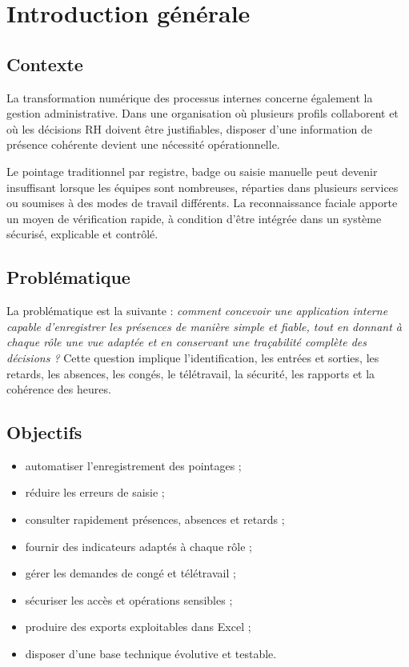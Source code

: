 \documentclass[11pt,a4paper,oneside]{report}
\begin{document}
\chapter{Introduction générale}
\section{Contexte}
La transformation numérique des processus internes concerne également la gestion administrative. Dans une organisation où plusieurs profils collaborent et où les décisions RH doivent être justifiables, disposer d'une information de présence cohérente devient une nécessité opérationnelle.

Le pointage traditionnel par registre, badge ou saisie manuelle peut devenir insuffisant lorsque les équipes sont nombreuses, réparties dans plusieurs services ou soumises à des modes de travail différents. La reconnaissance faciale apporte un moyen de vérification rapide, à condition d'être intégrée dans un système sécurisé, explicable et contrôlé.
\section{Problématique}
La problématique est la suivante : \textit{comment concevoir une application interne capable d'enregistrer les présences de manière simple et fiable, tout en donnant à chaque rôle une vue adaptée et en conservant une traçabilité complète des décisions ?}
Cette question implique l'identification, les entrées et sorties, les retards, les absences, les congés, le télétravail, la sécurité, les rapports et la cohérence des heures.
\section{Objectifs}
\begin{itemize}
\item automatiser l'enregistrement des pointages ;
\item réduire les erreurs de saisie ;
\item consulter rapidement présences, absences et retards ;
\item fournir des indicateurs adaptés à chaque rôle ;
\item gérer les demandes de congé et télétravail ;
\item sécuriser les accès et opérations sensibles ;
\item produire des exports exploitables dans Excel ;
\item disposer d'une base technique évolutive et testable.
\end{itemize}
\end{document}

